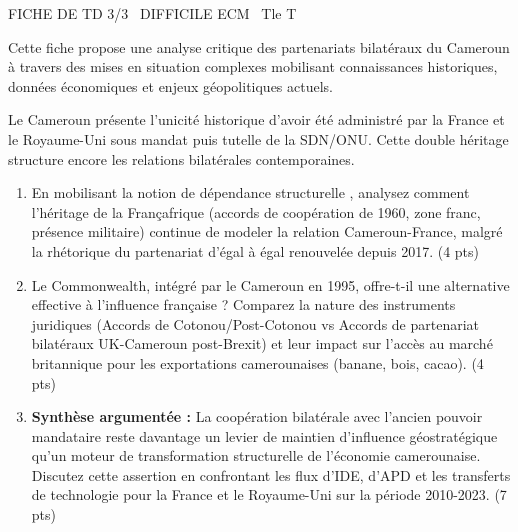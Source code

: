 \documentclass[11pt]{article}
\begin{document}
\begin{tcolorbox}[enhanced,colback=popink,colframe=popink,arc=10pt,boxrule=0pt,left=12pt,right=12pt,top=9pt,bottom=9pt]
{\color{white}\popxbold\small FICHE DE TD 3/3 \textbullet\ DIFFICILE \hfill ECM \textbullet\ Tle T\par}
\end{tcolorbox}
\vspace{4pt}
Cette fiche propose une analyse critique des partenariats bilatéraux du Cameroun à travers des mises en situation complexes mobilisant connaissances historiques, données économiques et enjeux géopolitiques actuels.

\begin{exercice}
Le Cameroun présente l'unicité historique d'avoir été administré par la France et le Royaume-Uni sous mandat puis tutelle de la SDN/ONU. Cette double héritage structure encore les relations bilatérales contemporaines.
\begin{enumerate}
    \item En mobilisant la notion de \og dépendance structurelle \fg, analysez comment l'héritage de la \og Françafrique \fg (accords de coopération de 1960, zone franc, présence militaire) continue de modeler la relation Cameroun-France, malgré la rhétorique du \og partenariat d'égal à égal \fg renouvelée depuis 2017. (4 pts)
    \item Le Commonwealth, intégré par le Cameroun en 1995, offre-t-il une alternative effective à l'influence française ? Comparez la nature des instruments juridiques (Accords de Cotonou/Post-Cotonou vs Accords de partenariat bilatéraux UK-Cameroun post-Brexit) et leur impact sur l'accès au marché britannique pour les exportations camerounaises (banane, bois, cacao). (4 pts)
    \item \textbf{Synthèse argumentée :} \og La coopération bilatérale avec l'ancien pouvoir mandataire reste davantage un levier de maintien d'influence géostratégique qu'un moteur de transformation structurelle de l'économie camerounaise. \fg Discutez cette assertion en confrontant les flux d'IDE, d'APD et les transferts de technologie pour la France et le Royaume-Uni sur la période 2010-2023. (7 pts)
\end{enumerate}
\end{exercice}
\end{document}
